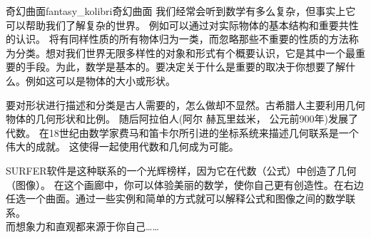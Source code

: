 ﻿\begin{surferIntroPage}{奇幻曲面}{fantasy_kolibri}{奇幻曲面}
我们经常会听到数学有多么复杂，但事实上它可以帮助我们了解复杂的世界。 例如可以通过对实际物体的基本结构和重要共性的认识。 将有同样性质的所有物体归为一类，而忽略那些不重要的性质的方法称为分类。想对我们世界无限多样性的对象和形式有个概要认识，它是其中一个最重要的手段。为此，数学是基本的。要决定关于什么是重要的取决于你想要了解什么。例如这可以是物体的大小或形状。\\

\vspace{0.4cm}


要对形状进行描述和分类是古人需要的，怎么做却不显然。古希腊人主要利用几何物体的几何形状和比例。 随后阿拉伯人(阿尔 赫瓦里兹米， 公元前900年)发展了代数。 在18世纪由数学家费马和笛卡尔所引进的坐标系统来描述几何联系是一个伟大的成就。 这使得一起使用代数和几何成为可能。\\

\vspace{0.4cm}

SURFER软件是这种联系的一个光辉榜样，因为它在代数（公式）中创造了几何（图像）。
在这个画廊中，你可以体验美丽的数学，使你自己更有创造性。在右边任选一个曲面。通过一些实例和简单的方式就可以解释公式和图像之间的数学联系。\\
而想象力和直观都来源于你自己……

\end{surferIntroPage}

